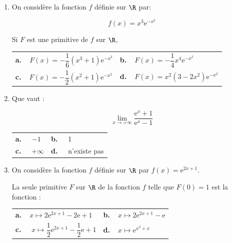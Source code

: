 \begin{enumerate}
\begin{center}
\begin{tabularx}{\linewidth}{*{2}{X}}
$x = -1$
\end{tabularx}
\end{center}

\item On considère la fonction $f$ définie sur $\R$ par:

\[f(x) = x^3\text{e}^{-x^2}\]

Si $F$ est une primitive de $f$ sur $\R$, 

\begin{center}
\renewcommand\arraystretch{1.9}
\begin{tabularx}{\linewidth}{*{2}{X}}
\textbf{a.~~}$F(x) = - \dfrac16\left(x^3 + 1\right)\text{e}^{-x^2}$ &
\textbf{b.~~}$F(x) = - \dfrac14 x^4\text{e}^{-x^2}$\\
\textbf{c.~~}$F(x)=-\dfrac12\left(x^2 + 1\right)\text{e}^{-x^2}$&
\textbf{d.~~}$F(x)= x^2\left(3 - 2x^2\right)\text{e}^{-x^2}$
\end{tabularx}
\renewcommand\arraystretch{1}
\end{center}

\item Que vaut :

\[\displaystyle\lim_{x \to + \infty} \dfrac{\text{e}^x + 1}{\text{e}^x - 1}\]

\begin{center}
\begin{tabularx}{\linewidth}{*{2}{X}}
\textbf{a.~~} $-1$&\textbf{b.~~}  1\\
\textbf{c.~~} $+ \infty$&\textbf{d.~~} n'existe pas
\end{tabularx}
\end{center}

\item On considère la fonction $f$ définie sur $\R$ par $f(x) = \text{e}^{2x +1}$.

La seule primitive $F$ sur $\R$ de la fonction $f$ telle que $F(0) = 1$ est la fonction :

\begin{center}
\begin{tabularx}{\linewidth}{*{2}{X}}
\textbf{a.~~}$x \longmapsto  2\text{e}^{2x+1} - 2\text{e} + 1$&\textbf{b.~~}$x \longmapsto  2\text{e}^{2x+1} - \text{e}$\\
\textbf{c.~~} $x \longmapsto \dfrac12\text{e}^{2x+1} - \dfrac12 \text{e} + 1$&\textbf{d.~~}$x \longmapsto \text{e}^{x^2 + x}$
\end{tabularx}
\end{center}


\end{enumerate}
